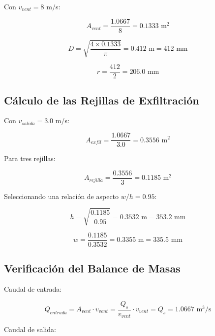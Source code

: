 Con $v_{vent} = 8$ m/s:

\begin{equation}
	A_{vent} = \frac{1.0667}{8} = 0.1333 \text{ m}^2
\end{equation}

\begin{equation}
	D = \sqrt{\frac{4 \times 0.1333}{\pi}} = 0.412 \text{ m} = 412 \text{ mm}
\end{equation}

\begin{equation}
	r = \frac{412}{2} = 206.0 \text{ mm}
\end{equation}

\subsection{Cálculo de las Rejillas de Exfiltración}

Con $v_{salida} = 3.0$ m/s:

\begin{equation}
	A_{exfil} = \frac{1.0667}{3.0} = 0.3556 \text{ m}^2
\end{equation}

Para tres rejillas:

\begin{equation}
	A_{rejilla} = \frac{0.3556}{3} = 0.1185 \text{ m}^2
\end{equation}

Seleccionando una relación de aspecto $w/h = 0.95$:

\begin{equation}
	h = \sqrt{\frac{0.1185}{0.95}} = 0.3532 \text{ m} = 353.2 \text{ mm}
\end{equation}

\begin{equation}
	w = \frac{0.1185}{0.3532} = 0.3355 \text{ m} = 335.5 \text{ mm}
\end{equation}

\subsection{Verificación del Balance de Masas}

Caudal de entrada:

\begin{equation}
	Q_{entrada} = A_{vent} \cdot v_{vent} = \frac{Q_s}{v_{vent}} \cdot v_{vent} = Q_s = 1.0667 \text{ m}^3/\text{s}
\end{equation}

Caudal de salida:

